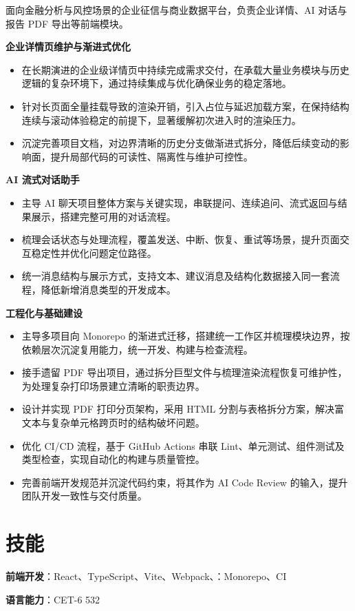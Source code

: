 \documentclass{resume}
\begin{document}
{\small\textcolor{ResumeMuted}{面向金融分析与风控场景的企业征信与商业数据平台，负责企业详情、AI 对话与报告 PDF 导出等前端模块。}}\par

\noindent\textbf{企业详情页维护与渐进式优化}
\begin{itemize}
  \item 在长期演进的企业级详情页中持续完成需求交付，在承载大量业务模块与历史逻辑的复杂环境下，通过持续集成与优化确保业务的稳定落地。
  \item 针对长页面全量挂载导致的渲染开销，引入占位与延迟加载方案，在保持结构连续与滚动体验稳定的前提下，显著缓解初次进入时的渲染压力。
  \item 沉淀完善项目文档，对边界清晰的历史分支做渐进式拆分，降低后续变动的影响面，提升局部代码的可读性、隔离性与维护可控性。
\end{itemize}

\vspace{0.15em}\noindent\textbf{AI 流式对话助手}
\begin{itemize}
  \item 主导 AI 聊天项目整体方案与关键实现，串联提问、连续追问、流式返回与结果展示，搭建完整可用的对话流程。
  \item 梳理会话状态与处理流程，覆盖发送、中断、恢复、重试等场景，提升页面交互稳定性并优化问题定位路径。
  \item 统一消息结构与展示方式，支持文本、建议消息及结构化数据接入同一套流程，降低新增消息类型的开发成本。
\end{itemize}

\vspace{0.15em}\noindent\textbf{工程化与基础建设}
\begin{itemize}
  \item 主导多项目向 Monorepo 的渐进式迁移，搭建统一工作区并梳理模块边界，按依赖层次沉淀复用能力，统一开发、构建与检查流程。
  \item 接手遗留 PDF 导出项目，通过拆分巨型文件与梳理渲染流程恢复可维护性，为处理复杂打印场景建立清晰的职责边界。
  \item 设计并实现 PDF 打印分页架构，采用 HTML 分割与表格拆分方案，解决富文本与复杂单元格跨页时的结构破坏问题。
  \item 优化 CI/CD 流程，基于 GitHub Actions 串联 Lint、单元测试、组件测试及类型检查，实现自动化的构建与质量管控。
  \item 完善前端开发规范并沉淀代码约束，将其作为 AI Code Review 的输入，提升团队开发一致性与交付质量。
\end{itemize}

\section{技能}
{\small
\textbf{前端开发}：React、TypeScript、Vite、Webpack、：Monorepo、CI \par
\textbf{语言能力}：CET-6 532
}
\end{document}
